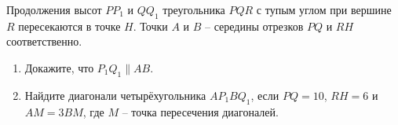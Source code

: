\begin{ex}
	\begin{condition}
		Продолжения высот \( PP_ 1\) и \( QQ_1  \) треугольника \( PQR  \) с тупым углом при вершине \( R  \) пересекаются в точке \( H \). Точки \( A  \) и \( B \) – середины отрезков \( PQ \) и \( RH  \) соответственно.
		\begin{enumerate}
			\item Докажите, что \( P_1Q_1 \parallel AB \).
			\item Найдите диагонали четырёхугольника \( AP_1BQ_1 \), если \( PQ = 10 \), \( RH =6  \) и \( AM =3BM \), где \( M \) – точка пересечения диагоналей.
		\end{enumerate}
	\end{condition}
\end{ex}
